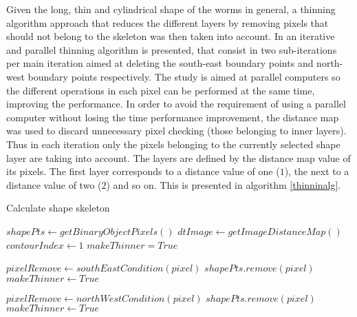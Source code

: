 Given the long, thin and cylindrical shape of the worms in general, a thinning algorithm
approach that reduces the different layers by removing pixels that should not 
belong to the skeleton was then taken into account. In \cite{thinning} an iterative and 
parallel thinning algorithm is presented, that consist in two sub-iterations per main 
iteration aimed at deleting the south-east boundary points and north-west boundary points 
respectively. The study is aimed at parallel computers so the different operations
in each pixel can be performed at the same time, improving the performance. In order
to avoid the requirement of using a parallel computer without losing the time performance 
improvement, the distance map was used to discard unnecessary pixel checking (those
belonging to inner layers). Thus in each iteration only the pixels belonging to the
currently selected shape layer are taking into account. The layers are defined by the
distance map value of its pixels. The first layer corresponds to a distance value
of one ($1$), the next to a distance value of two ($2$) and so on. This is presented in
algorithm \ref{thinninalg}.\\

\begin{algorithm}                     
\caption{Calculate shape skeleton}         
\label{thinninalg}                    
\begin{algorithmic}                   
\STATE $shapePts \leftarrow getBinaryObjectPixels()$
\STATE $dtImage \leftarrow getImageDistanceMap()$
\STATE $contourIndex \leftarrow 1$
\STATE $makeThinner = True$


\STATE {}
\STATE {}
\ELSE
\STATE $pixelRemove \leftarrow southEastCondition(pixel)$
\STATE $shapePts.remove(pixel)$
\STATE $makeThinner \leftarrow True$
\ENDIF

\ENDIF
\ENDFOR

\STATE {}
\STATE {}
\ELSE
\STATE $pixelRemove \leftarrow northWestCondition(pixel)$
\STATE $shapePts.remove(pixel)$
\STATE $makeThinner \leftarrow True$
\ENDIF
\ENDIF
\ENDFOR
\ENDWHILE
\STATE 
{}

\end{algorithmic}
\end{algorithm}


